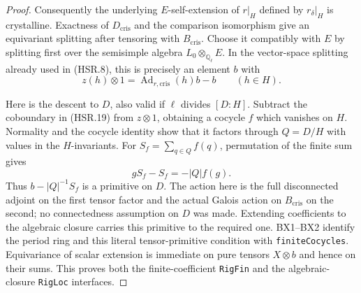 \begin{proof}
Consequently the underlying $E$-self-extension of $r|_H$ defined
by $r_\delta|_H$ is crystalline.  Exactness of $D_{\mathrm{cris}}$
and the comparison isomorphism give an equivariant splitting after
tensoring with $B_{\mathrm{cris}}$.  Choose it compatibly with $E$
by splitting first over the semisimple algebra
$L_0\otimes_{\mathbb Q_\ell}E$.  In the vector-space splitting
already used in (HSR.8), this is precisely an element $b$ with
\[
 z(h)\otimes1=\operatorname{Ad}_{r,\mathrm{cris}}(h)b-b
                  \qquad(h\in H).
 \tag{HSR.19}
\]

Here is the descent to $D$, also valid if $\ell$ divides $[D:H]$.
Subtract the coboundary in (HSR.19) from $z\otimes1$, obtaining
a cocycle $f$ which vanishes on $H$.  Normality and the cocycle
identity show that it factors through $Q=D/H$ with values in
the $H$-invariants.  For $S_f=\sum_{q\in Q}f(q)$, permutation
of the finite sum gives
\[
                  gS_f-S_f=-|Q|f(g).
\]
Thus $b-|Q|^{-1}S_f$ is a primitive on $D$.  The action here is
the full disconnected adjoint on the first tensor factor and
the actual Galois action on $B_{\mathrm{cris}}$ on the second;
no connectedness assumption on $D$ was made.  Extending
coefficients to the algebraic closure carries this primitive to
the required one.  BX1--BX2 identify the period ring and this
literal tensor-primitive condition with \texttt{finiteCocycles}.
Equivariance of scalar extension is immediate on pure tensors
$X\otimes b$ and hence on their sums.  This proves both the
finite-coefficient \texttt{RigFin} and the algebraic-closure
\texttt{RigLoc} interfaces.
\end{proof}

